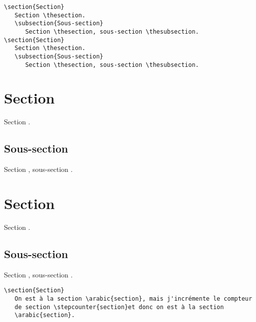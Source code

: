 \documentclass[fontsize=12pt,twoside=false,parskip=half,notitlepage,DIV=17,french]{scrbook}
\begin{document}
\begin{verbatim}
\section{Section}
   Section \thesection.
   \subsection{Sous-section}
      Section \thesection, sous-section \thesubsection.
\section{Section}
   Section \thesection.
   \subsection{Sous-section}
      Section \thesection, sous-section \thesubsection.
\end{verbatim}

\section{Section}
   Section \thesection.
   \subsection{Sous-section}
      Section \thesection, sous-section \thesubsection.
\section{Section}
   Section \thesection.
   \subsection{Sous-section}
      Section \thesection, sous-section \thesubsection.

\newpage

\setcounter{section}{0}
\setcounter{subsection}{0}


\begin{verbatim}
\section{Section}
   On est à la section \arabic{section}, mais j'incrémente le compteur
   de section \stepcounter{section}et donc on est à la section
   \arabic{section}.
\end{verbatim}
\end{document}

